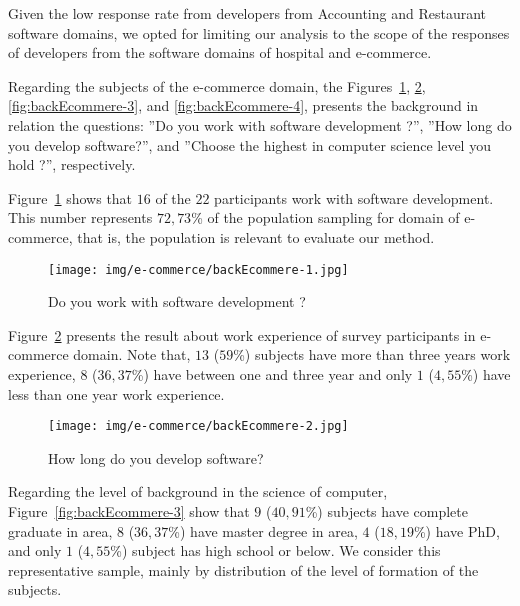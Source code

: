 Given the low response rate from developers from Accounting and Restaurant software domains, we opted for limiting our analysis to the scope of the responses of developers from the software domains of hospital and e-commerce.


Regarding the subjects  of the  e-commerce domain,  the  Figures~\ref{fig:backEcommere-1}, \ref{fig:backEcommere-2}, \ref{fig:backEcommere-3}, and \ref{fig:backEcommere-4},  presents the  background in relation the questions: ''Do you  work with software development ?'', ''How long do you develop software?'', and  ''Choose the  highest  in  computer science level you hold ?'', respectively.


Figure~\ref{fig:backEcommere-1} shows that $16$ of the $22$ participants work with software development. This number represents $72,73$\% of the population sampling for domain of e-commerce, that is, the population is relevant to evaluate our method.

\begin{figure}[!h]
\centering
\texttt{[image: img/e-commerce/backEcommere-1.jpg]}
\caption{Do you  work with software development ?}
\label{fig:backEcommere-1}
\end{figure}



\newpage
Figure~\ref{fig:backEcommere-2} presents the result about  work experience of survey participants in e-commerce domain. Note that, $13$ ($59$\%) subjects have more than three years work experience, $8$ ($36,37$\%) have between one and three year and only $1$ ($4,55$\%) have  less than one year work experience. 

\begin{figure}[!h]
\centering
\texttt{[image: img/e-commerce/backEcommere-2.jpg]}
\caption{How long do you develop software?}
\label{fig:backEcommere-2}
\end{figure}



Regarding the level of background in the science of computer, Figure~\ref{fig:backEcommere-3} show that $9$ ($40,91$\%) subjects have  complete graduate in area, $8$  ($36,37$\%) have  master degree in area, $4$ ($18,19$\%) have PhD, and only $1$ ($4,55$\%) subject has high school or below. We consider this representative sample,  mainly by distribution of the level of formation of the subjects.\\

